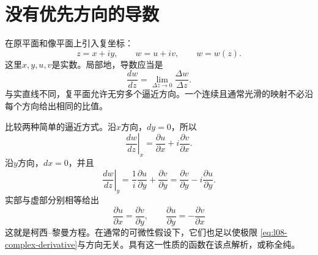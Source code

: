 \begin{classroomqa}
\end{classroomqa}

\begin{classroomqa}
\end{classroomqa}

\section{没有优先方向的导数}

在原平面和像平面上引入复坐标：
\begin{equation}
  z=x+iy,
  \qquad
  w=u+iv,
  \qquad
  w=w(z).
  \label{eq:l08-complex-coordinates}
\end{equation}
这里\(x,y,u,v\)是实数。局部地，导数应当是
\begin{equation}
  \frac{dw}{dz}
  =\lim_{\Delta z\to0}\frac{\Delta w}{\Delta z}.
  \label{eq:l08-complex-derivative}
\end{equation}
与实直线不同，复平面允许无穷多个逼近方向。一个连续且通常光滑的映射不必沿每个方向给出相同的比值。

比较两种简单的逼近方式。沿\(x\)方向，\(dy=0\)，所以
\begin{equation}
  \left.\frac{dw}{dz}\right|_x
  =\frac{\partial u}{\partial x}
  +i\frac{\partial v}{\partial x}.
\end{equation}
沿\(y\)方向，\(dx=0\)，并且
\begin{equation}
  \left.\frac{dw}{dz}\right|_y
  =\frac{1}{i}\frac{\partial u}{\partial y}
  +\frac{\partial v}{\partial y}
  =\frac{\partial v}{\partial y}
  -i\frac{\partial u}{\partial y}.
\end{equation}
实部与虚部分别相等给出
\begin{equation}
  \boxed{
  \frac{\partial u}{\partial x}
  =\frac{\partial v}{\partial y},
  \qquad
  \frac{\partial u}{\partial y}
  =-\frac{\partial v}{\partial x}}
  \label{eq:l08-cauchy-riemann}
\end{equation}
这就是柯西--黎曼方程。在通常的可微性假设下，它们也足以使极限
\eqref{eq:l08-complex-derivative}与方向无关。具有这一性质的函数在该点解析，或称全纯。

